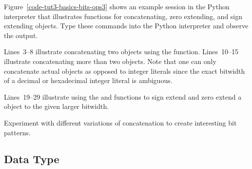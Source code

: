 \documentclass{cbxdoc}
\begin{document}
\clearpage

\begin{minipage}[t]{0.51\tw}
\setlength{\parskip}{0.5em}

  Figure~\ref{code-tut3-basics-bits-ops3} shows an example session in the
  Python interpreter that illustrates functions for concatenating, zero
  extending, and sign extending  objects. Type these commands
  into the Python interpreter and observe the output.

  Lines~3--8 illustrate concatenating two  objects using the
   function. Lines~10--15 illustrate concatenating more than
  two  objects. Note that one can only concatenate actual
   objects as opposed to integer literals since the exact
  bitwidth of a decimal or hexadecimal integer literal is ambiguous.

  Lines~19--29 illustrate using the  and  functions to
  sign extend and zero extend a  object to the given larger
  bitwidth.

  \begin{task}
    Experiment with different variations of concatenation to create
    interesting bit patterns.
  \end{task}

\end{minipage}
\hfill
\begin{minipage}[t]{0.46\tw}
  \vspace{-0.2in}

  
\end{minipage}

\clearpage

\subsection{ Data Type}
\label{sec-basics-bitstruct}
\end{document}
